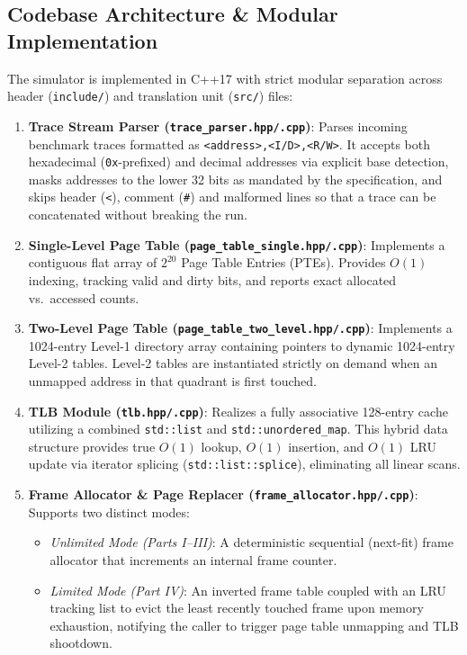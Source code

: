 \documentclass[11pt,a4paper]{article}
\begin{document}
\subsection{Codebase Architecture \& Modular Implementation}
The simulator is implemented in C++17 with strict modular separation across header (\texttt{include/}) and translation unit (\texttt{src/}) files:
\begin{enumerate}
    \item \textbf{Trace Stream Parser (\texttt{trace\_parser.hpp/.cpp})}: Parses incoming benchmark traces formatted as \texttt{<address>,<I/D>,<R/W>}. It accepts both hexadecimal (\texttt{0x}-prefixed) and decimal addresses via explicit base detection, masks addresses to the lower 32 bits as mandated by the specification, and skips header (\texttt{<}), comment (\texttt{\#}) and malformed lines so that a trace can be concatenated without breaking the run.
    \item \textbf{Single-Level Page Table (\texttt{page\_table\_single.hpp/.cpp})}: Implements a contiguous flat array of $2^{20}$ Page Table Entries (PTEs). Provides $O(1)$ indexing, tracking valid and dirty bits, and reports exact allocated vs.\ accessed counts.
    \item \textbf{Two-Level Page Table (\texttt{page\_table\_two\_level.hpp/.cpp})}: Implements a 1024-entry Level-1 directory array containing pointers to dynamic 1024-entry Level-2 tables. Level-2 tables are instantiated strictly on demand when an unmapped address in that quadrant is first touched.
    \item \textbf{TLB Module (\texttt{tlb.hpp/.cpp})}: Realizes a fully associative 128-entry cache utilizing a combined \texttt{std::list} and \texttt{std::unordered\_map}. This hybrid data structure provides true $O(1)$ lookup, $O(1)$ insertion, and $O(1)$ LRU update via iterator splicing (\texttt{std::list::splice}), eliminating all linear scans.
    \item \textbf{Frame Allocator \& Page Replacer (\texttt{frame\_allocator.hpp/.cpp})}: Supports two distinct modes:
    \begin{itemize}
        \item \emph{Unlimited Mode (Parts I--III)}: A deterministic sequential (next-fit) frame allocator that increments an internal frame counter.
        \item \emph{Limited Mode (Part IV)}: An inverted frame table coupled with an LRU tracking list to evict the least recently touched frame upon memory exhaustion, notifying the caller to trigger page table unmapping and TLB shootdown.

\end{itemize}
\end{enumerate}
\end{document}
